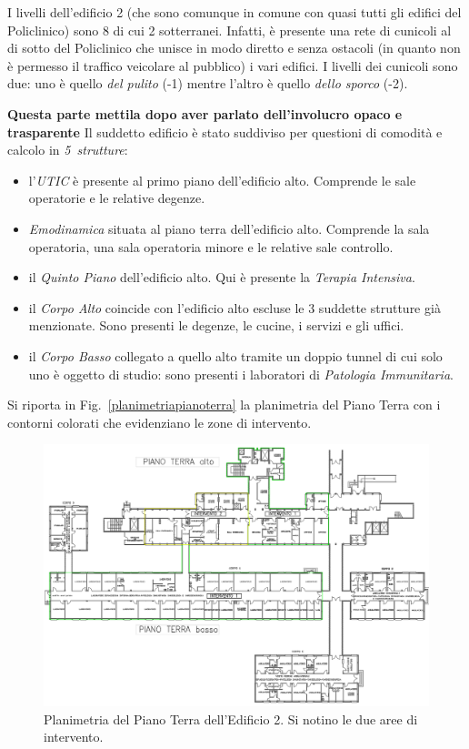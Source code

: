 I livelli dell'edificio 2 (che sono comunque in comune con quasi tutti gli edifici del Policlinico) sono 8 di cui 2 sotterranei. Infatti, è presente una rete di cunicoli al di sotto del Policlinico che unisce in modo diretto e senza ostacoli (in quanto non è permesso il traffico veicolare al pubblico) i vari edifici. I livelli dei cunicoli sono due: uno è quello \emph{del pulito} (-1) mentre l'altro è quello \emph{dello sporco} (-2).

\textbf{Questa parte mettila dopo aver parlato dell'involucro opaco e trasparente}
Il suddetto edificio è stato suddiviso per questioni di comodità e calcolo in \emph{5~strutture}:
\begin{itemize}
	\item l'\emph{UTIC} è presente al primo piano dell'edificio alto. Comprende le sale operatorie e le relative degenze.
	\item \emph{Emodinamica} situata al piano terra dell'edificio alto. Comprende la sala operatoria, una sala operatoria minore e le relative sale controllo.
	\item il \emph{Quinto Piano} dell'edificio alto. Qui è presente la \emph{Terapia Intensiva}.
	\item il \emph{Corpo Alto} coincide con l'edificio alto escluse le 3 suddette strutture già menzionate. Sono presenti le degenze, le cucine, i servizi e gli uffici.
	\item il \emph{Corpo Basso} collegato a quello alto tramite un doppio tunnel di cui solo uno è oggetto di studio: sono presenti i laboratori di \emph{Patologia Immunitaria}.
\end{itemize}
Si riporta in Fig.~\vref{planimetriapianoterra} la planimetria del Piano Terra con i contorni colorati che evidenziano le zone di intervento. %
\begin{figure}
	\centering
	\caption{Planimetria del Piano Terra dell'Edificio 2. Si notino le due aree di intervento.}
	\label{planimetriapianoterra}
	\includegraphics[width=\textheight]{6_2_cap/img/piano_terra}	
\end{figure}

